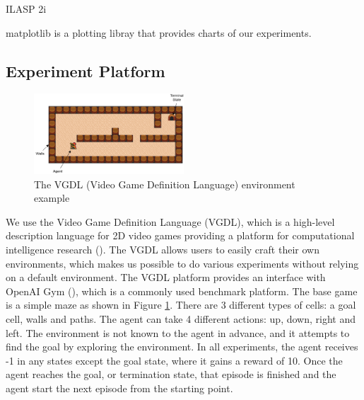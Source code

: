 ILASP 2i

matplotlib is a plotting libray that provides charts of our experiments.


\subsection{Experiment Platform}

\begin{figure}[!ht!b]
\centering
\includegraphics[width=0.5\textwidth]{./figures/env_sample}
\caption{The VGDL (Video Game Definition Language) environment example} 
\label{VGDL_sample}
\end{figure}

We use the Video Game Definition Language (VGDL), which is a high-level description language for 2D video games providing a platform for computational intelligence research (\cite{Schaul2013}).
The VGDL allows users to easily craft their own environments, which makes us possible to do various experiments without relying on a default environment. The VGDL platform provides an interface with OpenAI Gym (\cite{Brockman2016}), which is a commonly used benchmark platform.
The base game is a simple maze as shown in Figure \ref{VGDL_sample}.
There are 3 different types of cells: a goal cell, walls and paths. The agent can take 4 different actions: up, down, right and left.
The environment is not known to the agent in advance, and it attempts to find the goal by exploring the environment.
In all experiments, the agent receives -1 in any states except the goal state, where it gains a reward of 10.
Once the agent reaches the goal, or termination state, that episode is finished and the agent start the next episode from the starting point.

